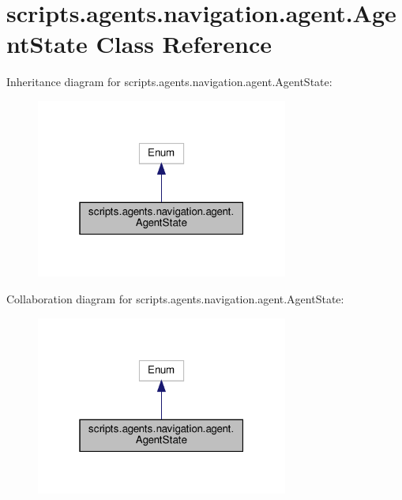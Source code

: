 \hypertarget{classscripts_1_1agents_1_1navigation_1_1agent_1_1AgentState}{}\section{scripts.\+agents.\+navigation.\+agent.\+Agent\+State Class Reference}
\label{classscripts_1_1agents_1_1navigation_1_1agent_1_1AgentState}


Inheritance diagram for scripts.\+agents.\+navigation.\+agent.\+Agent\+State\+:\nopagebreak
\begin{figure}[H]
\begin{center}
\leavevmode
\includegraphics[width=235pt]{d4/dd3/classscripts_1_1agents_1_1navigation_1_1agent_1_1AgentState__inherit__graph}
\end{center}
\end{figure}


Collaboration diagram for scripts.\+agents.\+navigation.\+agent.\+Agent\+State\+:\nopagebreak
\begin{figure}[H]
\begin{center}
\leavevmode
\includegraphics[width=235pt]{da/d74/classscripts_1_1agents_1_1navigation_1_1agent_1_1AgentState__coll__graph}
\end{center}
\end{figure}
